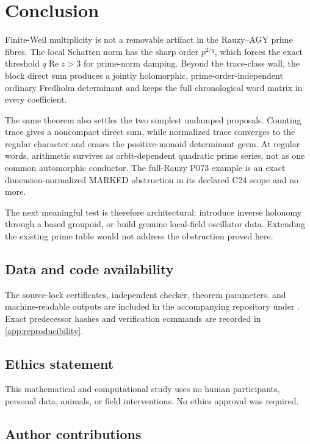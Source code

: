 \section{Conclusion}
\label{sec:conclusion}

Finite-Weil multiplicity is not a removable artifact in the Rauzy--AGY
prime fibres.  The local Schatten norm has the sharp order \(p^{2/q}\), which
forces the exact threshold \(q\operatorname{Re}z>3\) for prime-norm damping.
Beyond the trace-class wall, the block direct sum produces a jointly
holomorphic, prime-order-independent ordinary Fredholm determinant and keeps
the full chronological word matrix in every coefficient.

The same theorem also settles the two simplest undamped proposals.  Counting
trace gives a noncompact direct sum, while normalized trace converges to the
regular character and erases the positive-monoid determinant germ.  At
regular words, arithmetic survives as orbit-dependent quadratic prime
series, not as one common automorphic conductor.  The full-Rauzy P073
example is an exact dimension-normalized MARKED obstruction in its declared
C24 scope and no more.

The next meaningful test is therefore architectural: introduce inverse
holonomy through a based groupoid, or build genuine local-field oscillator
data.  Extending the existing prime table would not address the obstruction
proved here.

\subsection*{Data and code availability}

The source-lock certificates, independent checker, theorem parameters, and
machine-readable outputs are included in the accompanying repository under
.  Exact
predecessor hashes and verification commands are recorded in
\cref{app:reproducibility}.

\subsection*{Ethics statement}

This mathematical and computational study uses no human participants,
personal data, animals, or field interventions.  No ethics approval was
required.

\subsection*{Author contributions}

